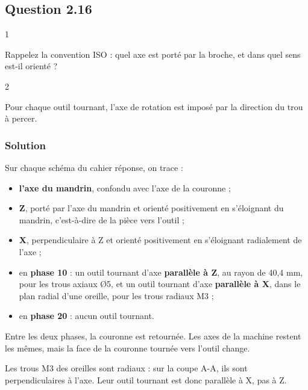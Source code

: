 \documentclass[11pt,a4paper]{article}
\providecommand{\tightlist}{\setlength{\itemsep}{0pt}\setlength{\parskip}{0pt}}
\begin{document}
\hypertarget{question-2.16}{%
\subsection{Question 2.16}\label{question-2.16}}

\begin{indication}{1}

Rappelez la convention ISO : quel axe est porté par la broche, et dans quel sens est-il orienté ?

\end{indication}

\begin{indication}{2}

Pour chaque outil tournant, l'axe de rotation est imposé par la direction du trou à percer.

\end{indication}

\hypertarget{solution-29}{%
\subsubsection{Solution}\label{solution-29}}

Sur chaque schéma du cahier réponse, on trace :

\begin{itemize}
\tightlist
\item
  \textbf{l'axe du mandrin}, confondu avec l'axe de la couronne ;
\item
  \textbf{Z}, porté par l'axe du mandrin et orienté positivement en s'éloignant du mandrin, c'est-à-dire de la pièce vers l'outil ;
\item
  \textbf{X}, perpendiculaire à Z et orienté positivement en s'éloignant radialement de l'axe ;
\item
  en \textbf{phase 10} : un outil tournant d'axe \textbf{parallèle à Z}, au rayon de 40,4 mm, pour les trous axiaux Ø5, et un outil tournant d'axe \textbf{parallèle à X}, dans le plan radial d'une oreille, pour les trous radiaux M3 ;
\item
  en \textbf{phase 20} : aucun outil tournant.
\end{itemize}

Entre les deux phases, la couronne est retournée. Les axes de la machine restent les mêmes, mais la face de la couronne tournée vers l'outil change.

\begin{piege}

Les trous M3 des oreilles sont radiaux : sur la coupe A-A, ils sont perpendiculaires à l'axe. Leur outil tournant est donc parallèle à X, pas à Z.

\end{piege}
\end{document}
